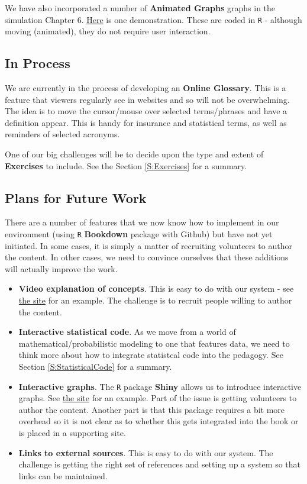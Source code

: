 \documentclass[
]{book}
\begin{document}
We have also incorporated a number of \textbf{Animated Graphs} graphs in the simulation Chapter 6. \href{https://openacttexts.github.io/Loss-Data-Analytics/C-Simulation.html\#S:ImportanceSampling}{Here} is one demonstration. These are coded in \texttt{R} - although moving (animated), they do not require user interaction.

\hypertarget{in-process}{%
\subsection{In Process}\label{in-process}}

We are currently in the process of developing an \textbf{Online Glossary}. This is a feature that viewers regularly see in websites and so will not be overwhelming. The idea is to move the cursor/mouse over selected terms/phrases and have a definition appear. This is handy for insurance and statistical terms, as well as reminders of selected acronyms.

One of our big challenges will be to decide upon the type and extent of \textbf{Exercises} to include. See the Section \ref{S:Exercises} for a summary.

\hypertarget{plans-for-future-work}{%
\subsection{Plans for Future Work}\label{plans-for-future-work}}

There are a number of features that we now know how to implement in our environment (using \texttt{R} \textbf{Bookdown} package with Github) but have not yet initiated. In some cases, it is simply a matter of recruiting volunteers to author the content. In other cases, we need to convince ourselves that these additions will actually improve the work.

\begin{itemize}
\item
  \textbf{Video explanation of concepts}. This is easy to do with our system - see \href{https://ewfreesres.github.io/RegressModel/index.html}{the site} for an example. The challenge is to recruit people willing to author the content.
\item
  \textbf{Interactive statistical code}. As we move from a world of mathematical/probabilistic modeling to one that features data, we need to think more about how to integrate statistcal code into the pedagogy. See Section \ref{S:StatisticalCode} for a summary.
\item
  \textbf{Interactive graphs}. The \texttt{R} package \textbf{Shiny} allows us to introduce interactive graphs. See \href{https://ewfrees.github.io/LDARcode/index.html\#32_gamma_distribution}{the site} for an example. Part of the issue is getting volunteers to author the content. Another part is that this package requires a bit more overhead so it is not clear as to whether this gets integrated into the book or is placed in a supporting site.
\item
  \textbf{Links to external sources}. This is easy to do with our system. The challenge is getting the right set of references and setting up a system so that links can be maintained.
\end{itemize}
\end{document}
